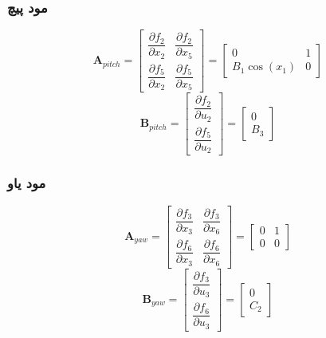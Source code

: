 \subsubsection{مود پیچ}
\begin{equation}
	\boldsymbol A_{pitch} = \begin{bmatrix}
		\dfrac{\partial  f_2}{\partial  x_2}& \dfrac{\partial  f_2}{\partial  x_5}
		\\[1em]
		\dfrac{\partial  f_5}{\partial  x_2}& \dfrac{\partial  f_5}{\partial  x_5}
	\end{bmatrix} = 
	\begin{bmatrix}
		0 & 1\\
		B_1\cos(x_1) & 0
	\end{bmatrix}
\end{equation}
\begin{equation}
	\boldsymbol B_{pitch} = \begin{bmatrix}
		\dfrac{\partial  f_2}{\partial  u_2}
		\\[1em]
		\dfrac{\partial  f_5}{\partial  u_2}
	\end{bmatrix} = 
	\begin{bmatrix}
		0\\
		B_3
	\end{bmatrix}
\end{equation}
\subsubsection{مود یاو}
\begin{equation}
	\boldsymbol A_{yaw} = \begin{bmatrix}
		\dfrac{\partial  f_3}{\partial  x_3}& \dfrac{\partial  f_3}{\partial  x_6}
		\\[1em]
		\dfrac{\partial  f_6}{\partial  x_3}& \dfrac{\partial  f_6}{\partial  x_6}
	\end{bmatrix} = 
	\begin{bmatrix}
		0 & 1\\
		0 & 0
	\end{bmatrix}
\end{equation}
\begin{equation}
	\boldsymbol B_{yaw} = \begin{bmatrix}
		\dfrac{\partial  f_3}{\partial  u_3}
		\\[1em]
		\dfrac{\partial  f_6}{\partial  u_3}
	\end{bmatrix} = 
	\begin{bmatrix}
		0\\
		C_2
	\end{bmatrix}
\end{equation}
